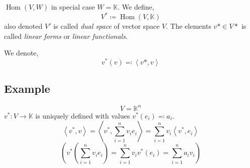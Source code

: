 \documentclass[a4paper,landscape,twocolumn]{article}
\newcommand\functional[1]{\left\langle{#1}\right\rangle}
\DeclareMathOperator\Hom{Hom} %
\begin{document}
%
$\Hom(V,W)$ in special case $W = \mathbb K$. We define,
\[ V^* \coloneqq \Hom(V,\mathbb K) \]
also denoted $V'$ is called \emph{dual space} of vector space $V$.
The elements $v* \in V*$ is called \emph{linear forms} or \emph{linear functionals}.

We denote,
\[ v^*(v) \eqqcolon \functional{v*,v} \]

\subsection{Example}
\[ V = \mathbb K^n \]
$v^*: V \to \mathbb K$ is uniquely defined with values $v^*(e_i) \eqqcolon a_i$.
\[ \functional{v^*,v} = \functional{v^*, \sum_{i=1}^n v_i e_i} = \sum_{i=1}^n v_i \functional{v^*,e_i} \]
\[ \left(v^*\left(\sum_{i=1}^n v_i e_i\right) = \sum_{i=1}^n v_i v^*(e_i) = \sum_{i=1}^n a_i v_i\right) \]
\end{document}
